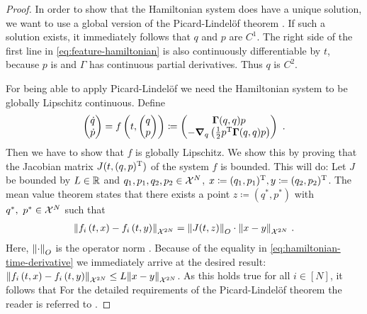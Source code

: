 \begin{proof}
	In order to show that the Hamiltonian system does have a unique solution, we want to use a global version of the Picard-Lindelöf theorem \cite[Theorem~1.2.3]{arino06}.
	If such a solution exists, it immediately follows that $q$ and $p$ are $C^1$.
	The right side of the first line in \cref{eq:feature-hamiltonian} is also continuously differentiable by $t$, because $p$ is and $\Gamma$ has continuous partial derivatives.
	Thus $q$ is $C^2$.
	
	For being able to apply Picard-Lindelöf we need the Hamiltonian system to be globally Lipschitz continuous.
	Define
	\begin{equation}
	\label{eq:hamiltonian-time-derivative}
		\begin{pmatrix}
			\dot{q}\\\dot{p}
		\end{pmatrix}
		= f\left(t, \begin{pmatrix}q\\p\end{pmatrix}\right) 
		\coloneqq 			
		\begin{pmatrix}
			\mathbf{\Gamma}(q, q)p\\ 
			-\grad_q \left(\frac{1}{2} p^\mathrm{T} \mathbf{\Gamma}(q, q) p\right)
		\end{pmatrix} \ .
	\end{equation}
	Then we have to show that $f$ is globally Lipschitz.
	We show this by proving that the Jacobian matrix $J(t, (q, p)^{\mathrm{T}})$ of the system $f$ is bounded.
	This will do:
	Let $J$ be bounded by $L \in \mathbb{R}$ and $q_1, p_1, q_2, p_2 \in \mathcal{X}^N$, $x \coloneqq (q_1, p_1)^{\mathrm{T}}, y \coloneqq (q_2, p_2)^{\mathrm{T}}$.
	The mean value theorem states that there exists a point $z \coloneqq (q^\ast, p^\ast)$ with $q^\ast,\ p^\ast \in \mathcal{X}^N$ such that
	\begin{align}
		\norm{f_i\left(t, x\right) - f_i\left(t, y\right)}_{\mathcal{X}^{2N}}
		= \norm{J(t, z)}_O\cdot \norm{x-y}_{\mathcal{X}^{2N}} \ .
	\end{align}
	Here, $\norm{\cdot}_O$ is the operator norm \cite{conway07}.
	Because of the equality in \cref{eq:hamiltonian-time-derivative} we immediately arrive at the desired result:
	$\norm{f_i\left(t, x\right) - f_i\left(t, y\right)}_{\mathcal{X}^{2N}} \leq L \norm{x - y}_{\mathcal{X}^{2N}}$.
	As this holds true for all $i \in [N]$, it follows that
	For the detailed requirements of the Picard-Lindelöf theorem the reader is referred to \cite{arino06}.
	

\end{proof}
